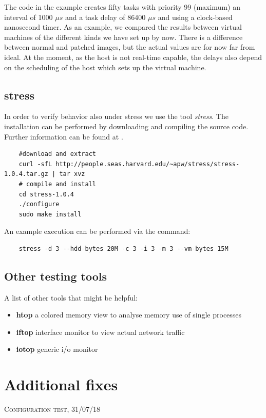 \documentclass[]{scrartcl}
\begin{document}
The code in the example creates fifty tasks with priority 99 (maximum) an interval of 1000 $\mu s$ and a task delay of 86400 $\mu s$ and using a clock-based nanosecond timer. 
As an example, we compared the results between virtual machines of the different kinds we have set up by now. There is a difference between normal and patched images, but the actual values are for now far from ideal. At the moment, as the host is not real-time capable, the delays also depend on the scheduling of the host which sets up the virtual machine. 

\subsection{stress}

In order to verify behavior also under stress we use the tool \textit{stress}. The installation can be performed by downloading and compiling the source code. Further information can be found at \cite{stress01}.

\begin{verbatim}
	#download and extract
	curl -sfL http://people.seas.harvard.edu/~apw/stress/stress-1.0.4.tar.gz | tar xvz
	# compile and install
	cd stress-1.0.4
	./configure
	sudo make install
\end{verbatim}

An example execution can be performed via the command:

\begin{verbatim}
	stress -d 3 --hdd-bytes 20M -c 3 -i 3 -m 3 --vm-bytes 15M
\end{verbatim}

\subsection{Other testing tools}

A list of other tools that might be helpful:

\begin{itemize}
	\item \textbf{htop} a colored memory view to analyse memory use of single processes
	\item \textbf{iftop} interface monitor to view actual network traffic
	\item \textbf{iotop} generic i/o monitor
\end{itemize}

\section{Additional fixes}
{\small\textsc{Configuration test, 31/07/18} \bigskip}
\end{document}
